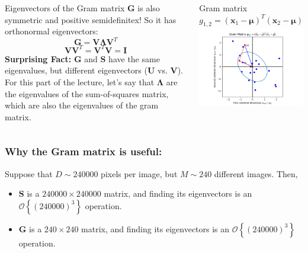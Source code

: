 \documentclass{beamer}
\begin{document}
\begin{frame}
  \begin{columns}
    \column{2.125in}
    \begin{block}{Eigenvectors of the Gram matrix}
      $\mathbf{G}$ is also symmetric and positive
      semidefinitex!  So it has orthonormal eigenvectors:
      \[
      \mathbf{G}=\mathbf{V}\bm{\Lambda} \mathbf{V}^T
      \]
      \[
      \mathbf{V}\mathbf{V}^T=\mathbf{V}^T\mathbf{V}=\mathbf{I}
      \]
      {\bf Surprising Fact:} $\mathbf{G}$ and $\mathbf{S}$ have the
      same eigenvalues, but different eigenvectors ($\mathbf{U}$
      vs. $\mathbf{V}$).  For this part of the lecture, let's say that
      $\bm{\Lambda}$ are the eigenvalues of the sum-of-squares matrix,
      which are also the eigenvalues of the gram matrix.
    \end{block}
    \column{2.125in}
    \begin{block}{Gram matrix $g_{1,2}=(\mathbf{x}_1-\bm{\mu})^T(\mathbf{x}_2-\bm{\mu})$}
      \includegraphics[width=2.1in]{figs/gram_matrix.png}
    \end{block}
  \end{columns}
\end{frame}

\begin{frame}
  \frametitle{Why the Gram matrix is useful:}

  Suppose that $D\sim 240000$ pixels per image, but $M\sim
  240$ different images.  Then,
  \begin{itemize}
  \item $\mathbf{S}$ is a $240000\times 240000$ matrix, and finding
    its eigenvectors is an $\mathcal{O}\left\{(240000)^3\right\}$
    operation.
  \item $\mathbf{G}$ is a $240\times 240$ matrix, and finding its
    eigenvectors is an $\mathcal{O}\left\{(240000)^3\right\}$
    operation.
  \end{itemize}
\end{frame}
\end{document}
